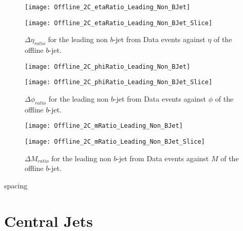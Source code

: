 		\begin{figure}[h]
			\centering
			
			\begin{minipage}[h]{0.33\linewidth}
				\texttt{[image: Offline\_2C\_etaRatio\_Leading\_Non\_BJet]}
			\end{minipage}
			\quad
			\begin{minipage}[h]{0.33\linewidth}
				\texttt{[image: Offline\_2C\_etaRatio\_Leading\_Non\_BJet\_Slice]}
			\end{minipage}
			\caption{$\Delta \eta_{ratio}$ for the leading \pt non $b$-jet from Data events against $\eta$ of the offline $b$-jet. }
			\label{fig:D:nonleadingbeta}
		\end{figure}
		
		\begin{figure}[h]
			\centering
			
			\begin{minipage}[h]{0.33\linewidth}
				\texttt{[image: Offline\_2C\_phiRatio\_Leading\_Non\_BJet]}
			\end{minipage}
			\quad
			\begin{minipage}[h]{0.33\linewidth}
				\texttt{[image: Offline\_2C\_phiRatio\_Leading\_Non\_BJet\_Slice]}
			\end{minipage}
			\caption{$\Delta \phi_{ratio}$ for the leading \pt non $b$-jet from Data events against $\phi$ of the offline $b$-jet. }
			\label{fig:D:nonleadingbphi}
		\end{figure}
		
		\begin{figure}[htb]
			\centering
			
			\begin{minipage}[h]{0.33\linewidth}
				\texttt{[image: Offline\_2C\_mRatio\_Leading\_Non\_BJet]}
			\end{minipage}
			\quad
			\begin{minipage}[h]{0.33\linewidth}
				\texttt{[image: Offline\_2C\_mRatio\_Leading\_Non\_BJet\_Slice]}
			\end{minipage}
			\caption{$\Delta M_{ratio}$ for the leading \pt non $b$-jet from Data events against $M$ of the offline $b$-jet. }
			\label{fig:MD:nonleadingbm}
		\end{figure}
		
		spacing

		\newpage\newpage
\section{Central Jets}

